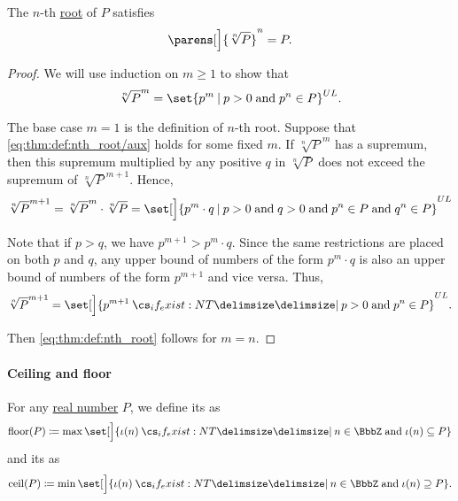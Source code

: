 \begin{proposition}\label{thm:power_of_nth_root}
  The \( n \)-th \hyperref[def:nth_root]{root} of \( P \) satisfies
  \begin{equation}\label{eq:thm:def:nth_root}
    \parens[\Big]{ \sqrt[n]{ P } }^n = P.
  \end{equation}
\end{proposition}
\begin{proof}
  We will use induction on \( m \geq 1 \) to show that
  \begin{equation}\label{eq:thm:def:nth_root/aux}
    \sqrt[n]{ P }^m = \set{ p^m \given p > 0 \T{and} p^n \in P }^{UL}.
  \end{equation}

  The base case \( m = 1 \) is the definition of \( n \)-th root. Suppose that \eqref{eq:thm:def:nth_root/aux} holds for some fixed \( m \). If \( \sqrt[n]{ P }^m \) has a supremum, then this supremum multiplied by any positive \( q \) in \( \sqrt[n]{ P } \) does not exceed the supremum of \( \sqrt[n]{ P }^{m+1} \). Hence,
  \begin{equation*}
    \sqrt[n]{ P }^{m+1} = \sqrt[n]{ P }^m \cdot \sqrt[n]{ P } = \set[\Big]{ p^m \cdot q \given p > 0 \T{and} q > 0 \T{and} p^n \in P \T{and} q^n \in P }^{UL}
  \end{equation*}

  Note that if \( p > q \), we have \( p^{m+1} > p^m \cdot q \). Since the same restrictions are placed on both \( p \) and \( q \), any upper bound of numbers of the form \( p^m \cdot q \) is also an upper bound of numbers of the form \( p^{m+1} \) and vice versa. Thus,
  \begin{equation*}
    \sqrt[n]{ P }^{m+1}
    =
    \set[\Big]{ p^{m+1} \given* p > 0 \T{and} p^n \in P }^{UL}.
  \end{equation*}

  Then \eqref{eq:thm:def:nth_root} follows for \( m = n \).
\end{proof}

\paragraph{Ceiling and floor}

\begin{definition}\label{def:real_floor_ceiling}\mimprovised
  For any \hyperref[def:real_numbers]{real number} \( P \), we define its  as
  \begin{equation*}
    \floor(P) \coloneqq \max\set[\Big]{ \iota(n) \given* n \in \BbbZ \T{and} \iota(n) \subseteq P }
  \end{equation*}
  and its  as
  \begin{equation*}
    \ceil(P) \coloneqq \min\set[\Big]{ \iota(n) \given* n \in \BbbZ \T{and} \iota(n) \supseteq P }.
  \end{equation*}
\end{definition}

